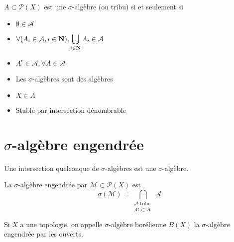 \begin{dfn}
    $A\subset \mathcal  P(X)$ est une $\sigma$-algèbre (ou tribu) si et seulement si
    \begin{itemize}
        \item $\emptyset \in  \mathcal  A$
        \item $\displaystyle \forall  (A_i \in  \mathcal A, i \in  \mathbf N), \bigcup_{i \in  \mathbf N} A_i \in  \mathcal  A$
        \item $A^c \in  \mathcal  A, \forall  A \in  \mathcal  A$
    \end{itemize}
\end{dfn}

\begin{rem}
\begin{itemize}
    \item Les $\sigma$-algèbres sont des algèbres
    \item $X \in  A$
    \item Stable par intersection dénombrable
\end{itemize}
\end{rem}

\section{$\sigma$-algèbre  engendrée}

\begin{lmm}
Une intersection quelconque de $\sigma$-algèbres est une $\sigma$-algèbre.
\end{lmm}

\begin{dfn}
    La $\sigma$-algèbre engendrée par  $\mathcal  M \subset \mathcal  P(X)$ est \[
        \sigma(\mathcal  M)=\bigcap_{\substack{\mathcal A \text{ tribu }\\ \mathcal  M \subset \mathcal  A}}\mathcal  A
    \] 
\end{dfn}

\begin{dfn}
    Si $X$ a une topologie, on appelle  $\sigma$-algèbre borélienne  $B(X)$ la  $\sigma$-algèbre engendrée par les ouverts.
\end{dfn}
